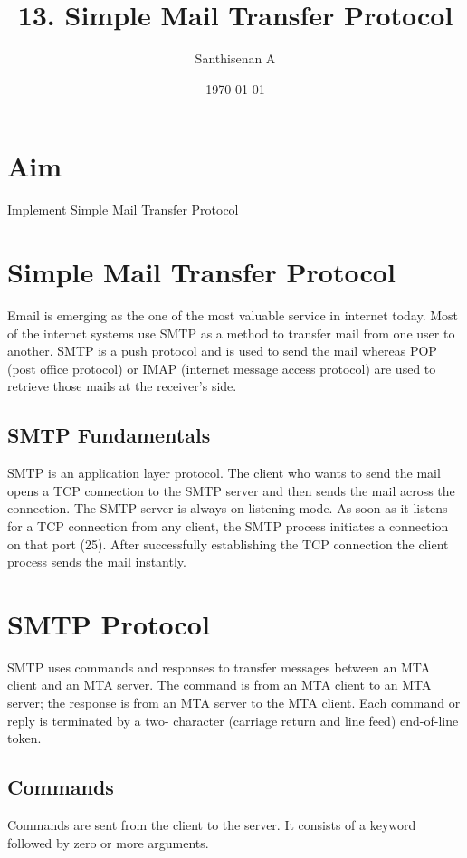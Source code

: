 \documentclass[a4paper,12pt]{article}
\begin{document}
    \title{13. Simple Mail Transfer Protocol}
    \author{Santhisenan A}
    \date{\today}
    \maketitle

\section{Aim}
Implement Simple Mail Transfer Protocol

\section { Simple Mail Transfer Protocol}
Email is emerging as the one of the most valuable service in internet today. 
Most of the internet systems use SMTP as a method to transfer mail from one user to another. 
SMTP is a push protocol and is used to send the mail whereas POP (post office protocol) 
or IMAP (internet message access protocol) are used to retrieve those mails at the receiver’s side.

\subsection{SMTP Fundamentals}
SMTP is an application layer protocol. The client who wants to send the mail opens a TCP connection to the 
SMTP server and then sends the mail across the connection. The SMTP server is always on listening mode. 
As soon as it listens for a TCP connection from any client, the SMTP process initiates a connection on that port 
(25). After successfully establishing the TCP connection the client process sends the mail instantly.

\section{SMTP Protocol}
SMTP uses commands and responses to transfer messages between an MTA client and an
 MTA server. The command is from an MTA client to an MTA server; the response is 
 from an MTA server to the MTA client. Each command or reply is terminated by a 
 two- character (carriage return and line feed) end-of-line token.
 
 \subsection{Commands}
 Commands are sent from the client to the server.
 It consists of a keyword followed by zero or more arguments.
\end{document}

